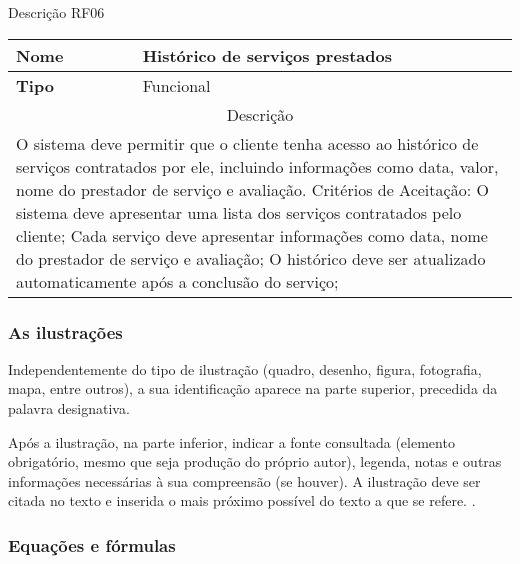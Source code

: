 \begin{quadro}[htb]
	\centering
	\caption{\label{Formatação do texto.}Descrição RF06}	
	\begin{tabular}{|l|p{11cm}|}
		\hline
		\textbf{Nome}    & Histórico de serviços prestados\\ \hline
		\textbf{Tipo}    & Funcional\\ \hline
		\multicolumn{2}{|c|}{Descrição}\\ \hline
		\multicolumn{2}{|p{12cm}|}{
			O sistema deve permitir que o cliente tenha acesso ao histórico de serviços contratados por ele, incluindo informações como data, valor, nome do prestador de serviço e avaliação. \newline
			\newline Critérios de Aceitação: \newline
			O sistema deve apresentar uma lista dos serviços contratados pelo cliente;
Cada serviço deve apresentar informações como data, nome do prestador de serviço e avaliação; \newline
			\newline O histórico deve ser atualizado automaticamente após a conclusão do serviço;
			} \\ \hline
	\end{tabular}
\end{quadro}

\subsubsection{As ilustrações}

Independentemente do tipo de ilustração (quadro, desenho, figura, fotografia, mapa, entre outros), a sua identificação aparece na parte superior, precedida da palavra designativa. 

\begin{citacao}
	Após a ilustração, na parte inferior, indicar a fonte consultada (elemento obrigatório, mesmo que seja produção do próprio autor), legenda, notas e outras informações necessárias à sua compreensão (se houver). A ilustração deve ser citada no texto e inserida o mais próximo possível do texto a que se refere. \cite[p. 11]{NBR14724:2011}.
\end{citacao}

\subsubsection{Equações e fórmulas}

